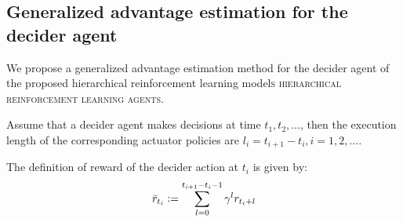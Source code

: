 \subsection{Generalized advantage estimation for the decider agent}
We propose a generalized advantage estimation method for the decider agent of the proposed hierarchical reinforcement learning model\textsc{s hierarchical reinforcement learning agents}. 

Assume that a decider agent makes decisions at time $t_1,t_2,\dots$, then the execution length of the corresponding actuator policies are $l_i = t_{i+1} - t_i, i=1,2,\dots$.

The definition of reward of the decider action at $t_i$ is given by:
\begin{align}
\bar{r}_{t_i} \vcentcolon=
 \sum_{l=0}^{t_{i+1}-t_i-1}
  \gamma^l r_{t_i+l}
\end{align}


